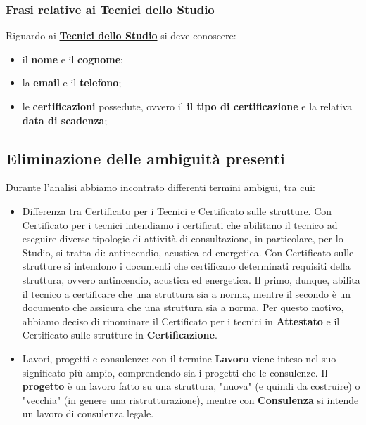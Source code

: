 \documentclass{elegantbook}
\begin{document}
	\subsubsection{Frasi relative ai Tecnici dello Studio}
	
	Riguardo ai \underline{\textbf{Tecnici dello Studio}} si deve conoscere:
	\begin{itemize}
		\item il \textbf{nome} e il \textbf{cognome};
		\item la \textbf{email} e il \textbf{telefono};
		\item le \textbf{certificazioni} possedute, ovvero il \textbf{il tipo di certificazione} e la relativa \textbf{data di scadenza};
	\end{itemize}
	
	\subsection{Eliminazione delle ambiguità presenti}
	Durante l'analisi abbiamo incontrato differenti termini ambigui, tra cui:
	\begin{itemize}
		\item Differenza tra Certificato per i Tecnici e Certificato sulle strutture. Con Certificato per i tecnici
                    intendiamo i certificati che abilitano il tecnico ad eseguire diverse tipologie di attività di consultazione,
                    in particolare, per lo Studio, si tratta di: antincendio, acustica ed energetica. Con Certificato sulle 
                    strutture si intendono i documenti che certificano determinati requisiti della struttura, ovvero antincendio,
                    acustica ed energetica. Il primo, dunque, abilita il tecnico a certificare che una struttura sia a norma,
                    mentre il secondo è un documento che assicura che una struttura sia a norma. Per questo motivo, abbiamo deciso
                    di rinominare il Certificato per i tecnici in \textbf{Attestato} e il Certificato sulle strutture in \textbf{Certificazione}.

		\item Lavori, progetti e consulenze: con il termine \textbf{Lavoro} viene inteso nel suo significato più ampio,
                    comprendendo sia i progetti che le consulenze. Il \textbf{progetto} è un lavoro fatto su una struttura,
                    "nuova" (e quindi da costruire) o "vecchia" (in genere una ristrutturazione), mentre con \textbf{Consulenza}
                    si intende un lavoro di consulenza legale.
	\end{itemize}
\end{document}
